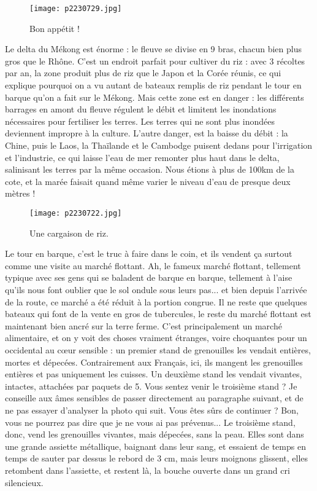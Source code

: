 \documentclass{book}
\begin{document}
\begin{figure}[h]
\centering
\texttt{[image: p2230729.jpg]}
\caption*{Bon appétit !}
\end{figure}

Le delta du Mékong est énorme : le fleuve se divise en 9 bras, chacun bien plus gros que le Rhône. C'est un endroit parfait pour cultiver du riz : avec 3 récoltes par an, la zone produit plus de riz que le Japon et la Corée réunis, ce qui explique pourquoi on a vu autant de bateaux remplis de riz pendant le tour en barque qu'on a fait sur le Mékong. Mais cette zone est en danger : les différents barrages en amont du fleuve régulent le débit et limitent les inondations nécessaires pour fertiliser les terres. Les terres qui ne sont plus inondées deviennent impropre à la culture. L'autre danger, est la baisse du débit : la Chine, puis le Laos, la Thaïlande et le Cambodge puisent dedans pour l'irrigation et l'industrie, ce qui laisse l'eau de mer remonter plus haut dans le delta, salinisant les terres par la même occasion. Nous étions à plus de 100km de la cote, et la marée faisait quand même varier le niveau d'eau de presque deux mètres !


\begin{figure}[h]
\centering
\texttt{[image: p2230722.jpg]}
\caption*{Une cargaison de riz.}
\end{figure}

Le tour en barque, c'est le truc à faire dans le coin, et ils vendent ça surtout comme une visite au marché flottant. Ah, le fameux marché flottant, tellement typique avec ses gens qui se baladent de barque en barque, tellement à l'aise qu'ils nous font oublier que le sol ondule sous leurs pas... et bien depuis l'arrivée de la route, ce marché a été réduit à la portion congrue. Il ne reste que quelques bateaux qui font de la vente en gros de tubercules, le reste du marché flottant est maintenant bien ancré sur la terre ferme. C'est principalement un marché alimentaire, et on y voit des choses vraiment étranges, voire choquantes pour un occidental au cœur sensible : un premier stand de grenouilles les vendait entières, mortes et dépecées. Contrairement aux Français, ici, ils mangent les grenouilles entières et pas uniquement les cuisses. Un deuxième stand les vendait vivantes, intactes, attachées par paquets de 5. Vous sentez venir le troisième stand ? Je conseille aux âmes sensibles de passer directement au paragraphe suivant, et de ne pas essayer d'analyser la photo qui suit. Vous êtes sûrs de continuer ? Bon, vous ne pourrez pas dire que je ne vous ai pas prévenus... Le troisième stand, donc, vend les grenouilles vivantes, mais dépecées, sans la peau. Elles sont dans une grande assiette métallique, baignant dans leur sang, et essaient de temps en temps de sauter par dessus le rebord de 3 cm, mais leurs moignons glissent, elles retombent dans l'assiette, et restent là, la bouche ouverte dans un grand cri silencieux.
\end{document}

